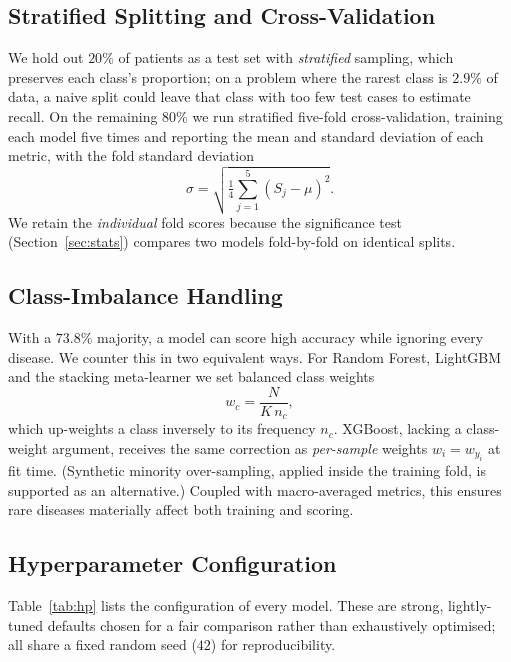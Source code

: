 \documentclass[conference]{IEEEtran}
\begin{document}
\subsection{Stratified Splitting and Cross-Validation}
We hold out $20\%$ of patients as a test set with \emph{stratified} sampling,
which preserves each class's proportion; on a problem where the rarest class is
$2.9\%$ of data, a naive split could leave that class with too few test cases to
estimate recall. On the remaining $80\%$ we run stratified five-fold
cross-validation, training each model five times and reporting the mean and
standard deviation of each metric, with the fold standard deviation
\begin{equation}
\sigma=\sqrt{\tfrac{1}{4}\sum_{j=1}^{5}\left(S_j-\mu\right)^2}.
\end{equation}
We retain the \emph{individual} fold scores because the significance test
(Section~\ref{sec:stats}) compares two models fold-by-fold on identical splits.

\subsection{Class-Imbalance Handling}
\label{sec:imb}
With a $73.8\%$ majority, a model can score high accuracy while ignoring every
disease. We counter this in two equivalent ways. For Random Forest, LightGBM and
the stacking meta-learner we set balanced class weights
\begin{equation}
w_c=\frac{N}{K\,n_c},
\end{equation}
which up-weights a class inversely to its frequency $n_c$. XGBoost, lacking a
class-weight argument, receives the same correction as \emph{per-sample} weights
$w_i=w_{y_i}$ at fit time. (Synthetic minority over-sampling, applied inside the
training fold, is supported as an alternative.) Coupled with macro-averaged
metrics, this ensures rare diseases materially affect both training and scoring.

\subsection{Hyperparameter Configuration}
Table~\ref{tab:hp} lists the configuration of every model. These are strong,
lightly-tuned defaults chosen for a fair comparison rather than exhaustively
optimised; all share a fixed random seed ($42$) for reproducibility.
\end{document}
